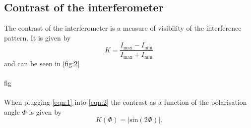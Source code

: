 \subsection{Contrast of the interferometer}
The contrast of the interferometer is a measure of visibility of the interference pattern. It is given by 
\begin{equation}
    \label{eqn:2}
    K = \frac{I_\text{max} - I_\text{min}}{I_\text{max} + I_\text{min}}
\end{equation}
and can be seen in \autoref{fig:2}
\\
\\
fig
\\
\\
When plugging \autoref{eqn:1} into \autoref{eqn:2} the contrast as a function of the polarisation angle $\Phi$ is given by 
\begin{equation}
    K\left(\Phi\right) = |\text{sin}\left(2\Phi\right)|.
\end{equation}


